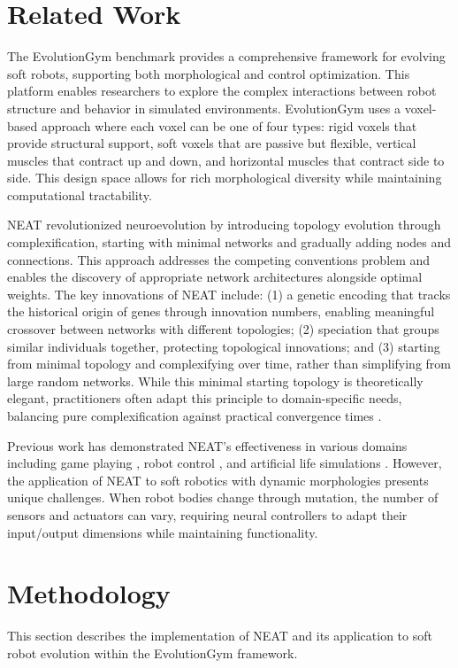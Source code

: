 \documentclass[conference]{IEEEtran}
\begin{document}
\section{Related Work}
The EvolutionGym benchmark \cite{evogym2021} provides a comprehensive framework for evolving soft robots, supporting both morphological and control optimization. This platform enables researchers to explore the complex interactions between robot structure and behavior in simulated environments. EvolutionGym uses a voxel-based approach where each voxel can be one of four types: rigid voxels that provide structural support, soft voxels that are passive but flexible, vertical muscles that contract up and down, and horizontal muscles that contract side to side. This design space allows for rich morphological diversity while maintaining computational tractability.

NEAT \cite{stanley2002evolving} revolutionized neuroevolution by introducing topology evolution through complexification, starting with minimal networks and gradually adding nodes and connections. This approach addresses the competing conventions problem and enables the discovery of appropriate network architectures alongside optimal weights. The key innovations of NEAT include: (1) a genetic encoding that tracks the historical origin of genes through innovation numbers, enabling meaningful crossover between networks with different topologies; (2) speciation that groups similar individuals together, protecting topological innovations; and (3) starting from minimal topology and complexifying over time, rather than simplifying from large random networks. While this minimal starting topology is theoretically elegant, practitioners often adapt this principle to domain-specific needs, balancing pure complexification against practical convergence times \cite{stanley2005real}.

Previous work has demonstrated NEAT's effectiveness in various domains including game playing \cite{stanley2005real}, robot control \cite{clune2011performance}, and artificial life simulations \cite{lehman2011abandoning}. However, the application of NEAT to soft robotics with dynamic morphologies presents unique challenges. When robot bodies change through mutation, the number of sensors and actuators can vary, requiring neural controllers to adapt their input/output dimensions while maintaining functionality.

\section{Methodology}
This section describes the implementation of NEAT and its application to soft robot evolution within the EvolutionGym framework.
\end{document}
